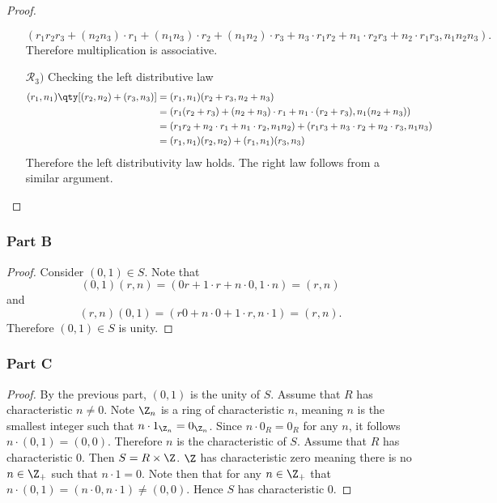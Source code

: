 \documentclass[12pt,titlepage]{extarticle}
\begin{document}
\begin{proof}
\begin{enumerate}
            \[
                (r_1r_2r_3 + (n_2 n_3) \cdot r_1 + (n_1 n_3) \cdot r_2 + (n_1 n_2) \cdot r_3 + n_3 \cdot r_1 r_2 + n_1 \cdot r_2 r_3 + n_2 \cdot r_1 r_3, n_1 n_2 n_3)
            .\]
            Therefore multiplication is associative.
        \tcbbreak
        \item[$\mathcal{R}_3 )$]
            Checking the left distributive law
            \begin{align*}
                (r_1, n_1) \qty[(r_2, n_2) + (r_3, n_3)] &= (r_1, n_1) (r_2 + r_3, n_2 + n_3) \\
                &= (r_1 (r_2 + r_3) + (n_2 + n_3)\cdot r_1 + n_1 \cdot (r_2 + r_3), n_1(n_2 + n_3)) \\
                &= (r_1 r_2 + n_2 \cdot r_1 + n_1 \cdot r_2, n_1 n_2) + (r_1 r_3 + n_3 \cdot r_2 + n_2\cdot r_3, n_1 n_3) \\
                &= (r_1, n_1) (r_2, n_2) + (r_1, n_1) (r_3, n_3)
            \end{align*}
            Therefore the left distributivity law holds. The right law follows from a similar argument. \qedhere
    \end{enumerate}
\end{proof}

\subsubsection*{Part B}
\begin{proof}
    Consider $(0, 1) \in S$. Note that
    \[
        (0,1) (r, n) = (0r + 1\cdot r + n \cdot 0, 1\cdot n) = (r, n)
    \]
    and
    \[
        (r, n)(0, 1) = (r0 + n \cdot 0 + 1 \cdot r, n \cdot 1) = (r, n)
    .\]
    Therefore $(0,1) \in S$ is unity.
\end{proof}

\subsubsection*{Part C}
\begin{proof}
    By the previous part, $(0, 1)$ is the unity of $S$. Assume that $R$ has characteristic $n \neq 0$. Note $\Z_n$ is a ring of characteristic $n$, meaning $n$ is the smallest integer such that $n \cdot 1_{\Z_{n}} = 0_{\Z_{n}}$. Since $n \cdot 0_{R} = 0_{R}$ for any $n$, it follows $n \cdot (0,1) = (0,0)$. Therefore $n$ is the characteristic of $S$. Assume that $R$ has characteristic $0$. Then $S = R \times \Z$. $\Z$ has characteristic zero meaning there is no $n \in \Z_+$ such that $n \cdot 1 = 0$. Note then that for any $n \in \Z_+$ that $n \cdot (0,1) = (n \cdot 0, n \cdot 1) \neq (0,0)$. Hence $S$ has characteristic $0$.
\end{proof}
\end{document}
